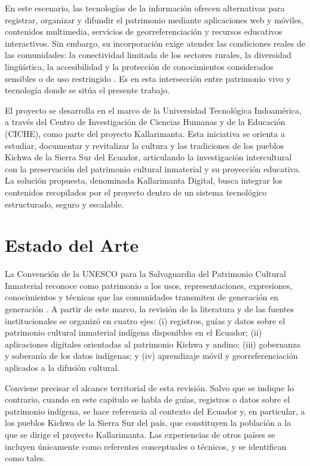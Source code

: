 En este escenario, las tecnologías de la información ofrecen alternativas para registrar, organizar y difundir el patrimonio mediante aplicaciones web y móviles, contenidos multimedia, servicios de georreferenciación y recursos educativos interactivos. Sin embargo, su incorporación exige atender las condiciones reales de las comunidades: la conectividad limitada de los sectores rurales, la diversidad lingüística, la accesibilidad y la protección de conocimientos considerados sensibles o de uso restringido \cite{christen2012information}. Es en esta intersección entre patrimonio vivo y tecnología donde se sitúa el presente trabajo.

El proyecto se desarrolla en el marco de la Universidad Tecnológica Indoamérica, a través del Centro de Investigación de Ciencias Humanas y de la Educación (CICHE), como parte del proyecto Kallarimanta. Esta iniciativa se orienta a estudiar, documentar y revitalizar la cultura y las tradiciones de los pueblos Kichwa de la Sierra Sur del Ecuador, articulando la investigación intercultural con la preservación del patrimonio cultural inmaterial y su proyección educativa. La solución propuesta, denominada Kallarimanta Digital, busca integrar los contenidos recopilados por el proyecto dentro de un sistema tecnológico estructurado, seguro y escalable.


\section{Estado del Arte}
La Convención de la UNESCO para la Salvaguardia del Patrimonio Cultural Inmaterial reconoce como patrimonio a los usos, representaciones, expresiones, conocimientos y técnicas que las comunidades transmiten de generación en generación \cite{unesco2003convencion}. A partir de este marco, la revisión de la literatura y de las fuentes institucionales se organizó en cuatro ejes: (i) registros, guías y datos sobre el patrimonio cultural inmaterial indígena disponibles en el Ecuador; (ii) aplicaciones digitales orientadas al patrimonio Kichwa y andino; (iii) gobernanza y soberanía de los datos indígenas; y (iv) aprendizaje móvil y georreferenciación aplicados a la difusión cultural.

Conviene precisar el alcance territorial de esta revisión. Salvo que se indique lo contrario, cuando en este capítulo se habla de guías, registros o datos sobre el patrimonio indígena, se hace referencia al contexto del Ecuador y, en particular, a los pueblos Kichwa de la Sierra Sur del país, que constituyen la población a la que se dirige el proyecto Kallarimanta. Las experiencias de otros países se incluyen únicamente como referentes conceptuales o técnicos, y se identifican como tales.

